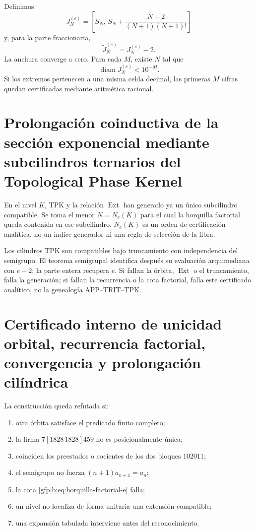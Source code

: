 Definimos
\[
 J_N^{(e)}=
 \left[
 S_N,\,
 S_N+\frac{N+2}{(N+1)(N+1)!}
 \right]
\]
y, para la parte fraccionaria,
\[
 \widetilde J_N^{(e)}=J_N^{(e)}-2.
\]
La anchura converge a cero. Para cada \(M\), existe \(N\) tal que
\[
 \operatorname{diam}J_N^{(e)}<10^{-M}.
\]
Si los extremos pertenecen a una misma celda decimal, las primeras \(M\)
cifras quedan certificadas mediante aritmética racional.

\section{Prolongación coinductiva de la sección exponencial mediante subcilindros ternarios del Topological Phase Kernel}

En el nivel \(K\), TPK y la relación \(\operatorname{Ext}\) han generado ya
un único subcilindro compatible. Se toma el menor \(N=N_e(K)\) para el cual
la horquilla factorial queda contenida en ese subcilindro. \(N_e(K)\) es un
orden de certificación analítica, no un índice generador ni una regla de
selección de la fibra.

Los cilindros TPK son compatibles bajo truncamiento con independencia del
semigrupo. El teorema semigrupal identifica después su evaluación
arquimediana con \(e-2\); la parte entera recupera \(e\). Si fallan la órbita,
\(\operatorname{Ext}\) o el truncamiento, falla la generación; si fallan la
recurrencia o la cota factorial, falla este certificado analítico, no la
genealogía APP--TRIT--TPK.

\section{Certificado interno de unicidad orbital, recurrencia factorial, convergencia y prolongación cilíndrica}

\begin{remark}
La construcción queda refutada si:
\begin{enumerate}
 \item otra órbita satisface el predicado finito completo;
 \item la firma \(7[1828\,1828]459\) no es posicionalmente única;
 \item coinciden los preestados o cocientes de los dos bloques \(102011\);
 \item el semigrupo no fuerza \((n+1)a_{n+1}=a_n\);
 \item la cota \eqref{gfp:b:eq:horquilla-factorial-e} falla;
 \item un nivel no localiza de forma unitaria una extensión compatible;
 \item una expansión tabulada interviene antes del reconocimiento.
\end{enumerate}
\end{remark}
